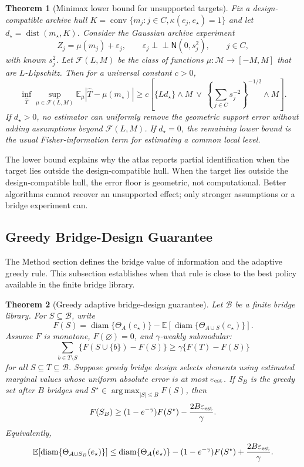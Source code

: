\documentclass[11pt]{article}
\numberwithin{equation}{section}
\newtheorem{theorem}{Theorem}[section]
\DeclareMathOperator{\diam}{diam}
\DeclareMathOperator{\dist}{dist}
\DeclareMathOperator{\conv}{conv}
\DeclareMathOperator*{\argmax}{arg\,max}
\newcommand{\E}{\mathbb E}
\newcommand{\1}{\mathbf 1}
\newcommand{\cB}{\mathcal B}
\newcommand{\cF}{\mathcal F}
\newcommand{\cM}{\mathcal M}
\newcommand{\abs}[1]{\left\lvert #1\right\rvert}
\newcommand{\eps}{\varepsilon}
\newcommand{\ind}{\perp\!\!\!\perp}
\newcommand{\Normal}{\mathsf N}
\begin{document}
\begin{theorem}[Minimax lower bound for unsupported targets]
\label{thm:minimax}
Fix a design-compatible archive hull \(K=\conv\{m_j:j\in C,\kappa(e_j,e_\star)=1\}\) and let \(d_\star=\dist(m_\star,K)\).  Consider the Gaussian archive experiment
\[
  Z_j=\mu(m_j)+\varepsilon_j,
  \qquad
  \varepsilon_j\ind \Normal(0,s_j^2),
  \qquad j\in C,
\]
with known \(s_j^2\).  Let \(\cF(L,M)\) be the class of functions \(\mu:\cM\to[-M,M]\) that are \(L\)-Lipschitz.  Then for a universal constant \(c>0\),
\begin{equation}
\label{eq:minimax-bound}
  \inf_{\widehat T}
  \sup_{\mu\in\cF(L,M)}
  \E_\mu\abs{\widehat T-\mu(m_\star)}
  \ge
  c\left[
    \{Ld_\star\}\wedge M
    \ \vee\
    \left\{\sum_{j\in C}s_j^{-2}\right\}^{-1/2}\wedge M
  \right].
\end{equation}
If \(d_\star>0\), no estimator can uniformly remove the geometric support error without adding assumptions beyond \(\cF(L,M)\).  If \(d_\star=0\), the remaining lower bound is the usual Fisher-information term for estimating a common local level.
\end{theorem}

The lower bound explains why the atlas reports partial identification when the target lies outside the design-compatible hull.  When the target lies outside the design-compatible hull, the error floor is geometric, not computational.  Better algorithms cannot recover an unsupported effect; only stronger assumptions or a bridge experiment can.

\subsection{Greedy Bridge-Design Guarantee}

The Method section defines the bridge value of information and the adaptive greedy rule.  This subsection establishes when that rule is close to the best policy available in the finite bridge library.

\begin{theorem}[Greedy adaptive bridge-design guarantee]
\label{thm:bridge}
Let \(\cB\) be a finite bridge library.  For \(S\subseteq\cB\), write
\[
  F(S)=\diam\{\Theta_A(e_\star)\}-\E[\diam\{\Theta_{A\cup S}(e_\star)\}].
\]
Assume \(F\) is monotone, \(F(\varnothing)=0\), and \(\gamma\)-weakly submodular:
\[
  \sum_{b\in T\setminus S}\{F(S\cup\{b\})-F(S)\}
  \ge
  \gamma\{F(T)-F(S)\}
\]
for all \(S\subseteq T\subseteq\cB\).  Suppose greedy bridge design selects elements using estimated marginal values whose uniform absolute error is at most \(\eps_{\rm est}\).  If \(S_B\) is the greedy set after \(B\) bridges and \(S^\star\in\argmax_{|S|\le B}F(S)\), then
\begin{equation}
\label{eq:bridge-bound}
  F(S_B)
  \ge
  (1-e^{-\gamma})F(S^\star)-\frac{2B\eps_{\rm est}}{\gamma}.
\end{equation}
Equivalently,
\[
  \E[\diam\{\Theta_{A\cup S_B}(e_\star)\}]
  \le
  \diam\{\Theta_A(e_\star)\}
  -(1-e^{-\gamma})F(S^\star)
  +\frac{2B\eps_{\rm est}}{\gamma}.
\]
\end{theorem}
\end{document}
